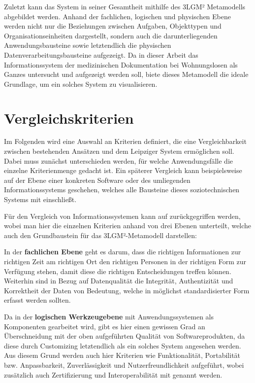 Zuletzt kann das System in seiner Gesamtheit mithilfe des 3LGM² Metamodells abgebildet werden. Anhand der fachlichen, logischen und physischen Ebene werden nicht nur die Beziehungen zwischen Aufgaben, Objekttypen und Organisationseinheiten dargestellt, sondern auch die darunterliegenden Anwendungsbausteine sowie letztendlich die physischen Datenverarbeitungsbausteine aufgezeigt. Da in dieser Arbeit das Informationssystem der medizinischen Dokumentation bei Wohnungslosen als Ganzes untersucht und aufgezeigt werden soll, biete dieses Metamodell die ideale Grundlage, um ein solches System zu visualisieren.


\section{Vergleichskriterien}\label{sec:criteria}

Im Folgenden wird eine Auswahl an Kriterien definiert, die eine Vergleichbarkeit zwischen bestehenden Ansätzen und dem Leipziger System ermöglichen soll. Dabei muss zunächst unterschieden werden, für welche Anwendungsfälle die einzelne Kriterienmenge gedacht ist. Ein späterer Vergleich kann beispielsweise auf der Ebene einer konkreten Software oder des umliegenden Informationssystems geschehen, welches alle Bausteine dieses soziotechnischen Systems mit einschließt.

Für den Vergleich von Informationssystemen kann auf \citet{Winter.2023} zurückgegriffen werden, wobei man hier die einzelnen Kriterien anhand von drei Ebenen unterteilt, welche auch den Grundbaustein für das 3LGM²-Metamodell darstellen:

In der \textbf{fachlichen Ebene} geht es darum, dass die richtigen Informationen zur richtigen Zeit am richtigen Ort den richtigen Personen in der richtigen Form zur Verfügung stehen, damit diese die richtigen Entscheidungen treffen können. Weiterhin sind in Bezug auf Datenqualität die Integrität, Authentizität und Korrektheit der Daten von Bedeutung, welche in möglichst standardisierter Form erfasst werden sollten.

Da in der \textbf{logischen Werkzeugebene} mit Anwendungssystemen als Komponenten gearbeitet wird, gibt es hier einen gewissen Grad an Überschneidung mit der oben aufgeführten Qualität von Softwareprodukten, da diese durch Customizing letztendlich als ein solches System angesehen werden. Aus diesem Grund werden auch hier Kriterien wie Funktionalität, Portabilität bzw. Anpassbarkeit, Zuverlässigkeit und Nutzerfreundlichkeit aufgeführt, wobei zusätzlich auch Zertifizierung und Interoperabilität mit genannt werden.

